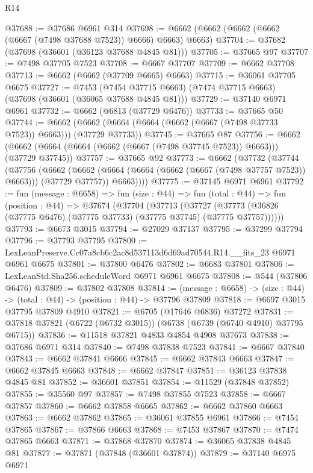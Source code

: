 \begin{lexlean}{R14}
\begin{coremodule}
@37688 := @37686 @6961 @314
@37698 := @6662 (@6662 (@6662 (@6662 (@6667 (@7498 @37688 @7523)) @6666) @6663) @6663)
@37704 := @37682 (@37698 (@36601 (@36123 @37688 @4845 @81)))
@37705 := @37665 @97
@37707 := @7498 @37705 @7523
@37708 := @6667 @37707
@37709 := @6662 @37708
@37713 := @6662 (@6662 (@37709 @6665) @6663)
@37715 := @36061 @37705 @6675
@37727 := @7453
    (@7454 @37715 @6663)
    (@7474 @37715 @6663)
    (@37698 (@36601 (@36065 @37688 @4845 @81)))
@37729 := @37140 @6971 @6961
@37732 := @6662 (@6813 (@37729 @6476))
@37733 := @37665 @50
@37744 := @6662 (@6662 (@6664 (@6664 (@6662 (@6667 (@7498 @37733 @7523)) @6663))) (@37729 @37733))
@37745 := @37665 @87
@37756 := @6662 (@6662 (@6664 (@6664 (@6662 (@6667 (@7498 @37745 @7523)) @6663))) (@37729 @37745))
@37757 := @37665 @92
@37773 := @6662
    (@37732
      (@37744
        (@37756
          (@6662
            (@6662 (@6664 (@6664 (@6662 (@6667 (@7498 @37757 @7523)) @6663))) (@37729 @37757))
            @6663))))
@37775 := @37145 @6971 @6961
@37792 := fun (message : @6658) =>
  fun (size : @44) =>
  fun (total : @44) =>
  fun (position : @44) =>
  @37674
    (@37704
      (@37713
        (@37727 (@37773 (@36826 (@37775 @6476) (@37775 @37733) (@37775 @37745) (@37775 @37757))))))
@37793 := @6673 @3015
@37794 := @27029 @37137
@37795 := @37299 @37794
@37796 := @37793 @37795
@37800 := LexLeanPreserve.Cc07a8cb6c2ac8d537113d6d69ad70544.R14.__fits_23 @6971 @6961 @6675
@37801 := @37800 @6476
@37802 := @6683 @37801
@37806 := LexLeanStd.Sha256.scheduleWord @6971 @6961 @6675
@37808 := @544 (@37806 @6476)
@37809 := @37802 @37808
@37814 := (message : @6658) -> (size : @44) -> (total : @44) -> (position : @44) -> @37796 @37809
@37818 := @6697 @3015 @37795 @37809 @4910
@37821 := @6705 (@17646 @6836) @37272
@37831 := @37818 @37821 (@6722 (@6732 @3015)) (@6738 (@6739 (@6740 @4910) @37795 @6715))
@37836 := @11518 @37821 @4833 @4854 @4908 @37673
@37838 := @37686 @6971 @314
@37840 := @7498 @37838 @7523
@37841 := @6667 @37840
@37843 := @6662 @37841 @6666
@37845 := @6662 @37843 @6663
@37847 := @6662 @37845 @6663
@37848 := @6662 @37847
@37851 := @36123 @37838 @4845 @81
@37852 := @36601 @37851
@37854 := @11529 (@37848 @37852)
@37855 := @35560 @97
@37857 := @7498 @37855 @7523
@37858 := @6667 @37857
@37860 := @6662 @37858 @6665
@37862 := @6662 @37860 @6663
@37863 := @6662 @37862
@37865 := @36061 @37855 @6961
@37866 := @7454 @37865
@37867 := @37866 @6663
@37868 := @7453 @37867
@37870 := @7474 @37865 @6663
@37871 := @37868 @37870
@37874 := @36065 @37838 @4845 @81
@37877 := @37871 (@37848 (@36601 @37874))
@37879 := @37140 @6975 @6971

\end{coremodule}
\end{lexlean}
